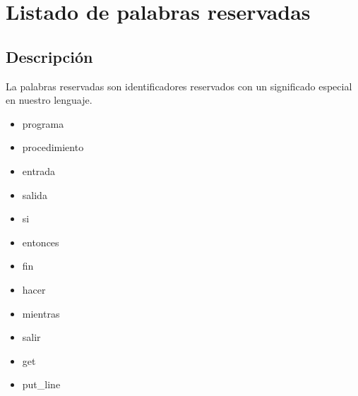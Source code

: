             \hfill
            \clearpage


 
\section{Listado de palabras reservadas}
    
        \subsection{Descripción}
        
        La palabras reservadas son identificadores reservados con un significado especial en nuestro lenguaje.
        
        \begin{itemize}
             \item programa
             \item procedimiento
             \item entrada
             \item salida
             \item si
             \item entonces
             \item fin
             \item hacer
             \item mientras
             \item salir
             \item get
             \item put\_line
       \end{itemize}

       \hfill
       \clearpage



